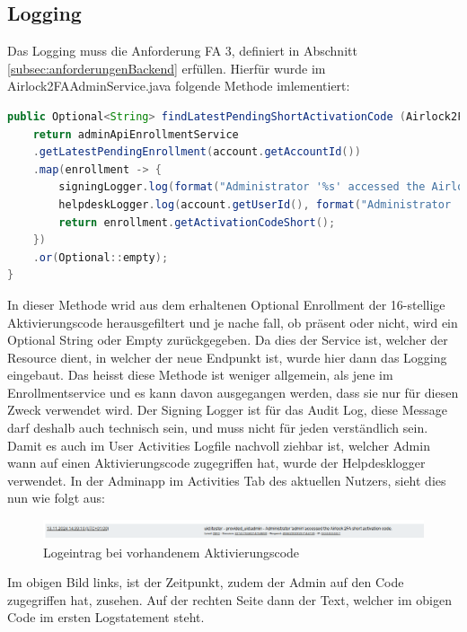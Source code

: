 \subsection{Logging}
Das Logging muss die Anforderung \flqq FA 3\frqq , definiert in Abschnitt \ref{subsec:anforderungenBackend} erfüllen. Hierfür wurde im Airlock2FAAdminService.java folgende Methode imlementiert:
\begin{lstlisting}[language=Java]
	public Optional<String> findLatestPendingShortActivationCode (Airlock2FAUserAccount account) {
	return adminApiEnrollmentService
	.getLatestPendingEnrollment(account.getAccountId())
	.map(enrollment -> {
		signingLogger.log(format("Administrator '%s' accessed the Airlock 2FA short activation code of user '%s'.", administrator.getName(), account.getUserId()));
		helpdeskLogger.log(account.getUserId(), format("Administrator '%s' accessed the Airlock 2FA short activation code.", administrator.getName()));
		return enrollment.getActivationCodeShort();
	})
	.or(Optional::empty);
}
\end{lstlisting}
In dieser Methode wrid aus dem erhaltenen Optional Enrollment der 16-stellige Aktivierungscode herausgefiltert und je nache fall, ob präsent oder nicht, wird ein Optional String oder Empty zurückgegeben. Da dies der Service ist, welcher der Resource dient, in welcher der neue Endpunkt ist, wurde hier dann das Logging eingebaut. Das heisst diese Methode ist weniger allgemein, als jene im Enrollmentservice und es kann davon ausgegangen werden, dass sie nur für diesen Zweck verwendet wird. Der Signing Logger ist für das Audit Log, diese Message darf deshalb auch technisch sein, und muss nicht für jeden verständlich sein.
Damit es auch im User Activities Logfile nachvoll ziehbar ist, welcher Admin wann auf einen Aktivierungscode zugegriffen hat, wurde der Helpdesklogger verwendet. In der Adminapp im Activities Tab des aktuellen Nutzers, sieht dies nun wie folgt aus:
\begin{figure}[H]
	\begin{center}
		\includegraphics[width=1.0\textwidth]{ressourcen/logpresent}
		\caption[Logeintrag bei vorhandenem Aktivierungscode]{Logeintrag bei vorhandenem Aktivierungscode}\label{fig:logpresent}
	\end{center}
\end{figure}
\noindent Im obigen Bild links, ist der Zeitpunkt, zudem der Admin auf den Code zugegriffen hat, zusehen. Auf der rechten Seite dann der Text, welcher im obigen Code im ersten Logstatement steht. 

